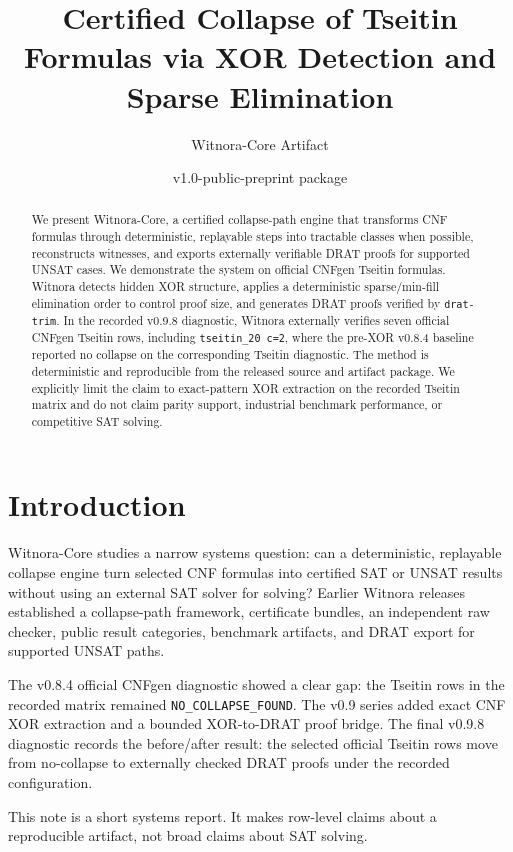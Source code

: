 \documentclass[10pt]{article}
\title{Certified Collapse of Tseitin Formulas via XOR Detection and Sparse Elimination}
\author{Witnora-Core Artifact}
\date{v1.0-public-preprint package}
\begin{document}
\maketitle

\begin{abstract}
We present Witnora-Core, a certified collapse-path engine that transforms CNF
formulas through deterministic, replayable steps into tractable classes when
possible, reconstructs witnesses, and exports externally verifiable DRAT proofs
for supported UNSAT cases. We demonstrate the system on official CNFgen Tseitin
formulas. Witnora detects hidden XOR structure, applies a deterministic
sparse/min-fill elimination order to control proof size, and generates DRAT
proofs verified by \texttt{drat-trim}. In the recorded v0.9.8 diagnostic,
Witnora externally verifies seven official CNFgen Tseitin rows, including
\texttt{tseitin\_20 c=2}, where the pre-XOR v0.8.4 baseline reported no
collapse on the corresponding Tseitin diagnostic. The method is deterministic
and reproducible from the released source and artifact package. We explicitly
limit the claim to exact-pattern XOR extraction on the recorded Tseitin matrix
and do not claim parity support, industrial benchmark performance, or
competitive SAT solving.
\end{abstract}

\section{Introduction}

Witnora-Core studies a narrow systems question: can a deterministic,
replayable collapse engine turn selected CNF formulas into certified SAT or
UNSAT results without using an external SAT solver for solving? Earlier
Witnora releases established a collapse-path framework, certificate bundles,
an independent raw checker, public result categories, benchmark artifacts, and
DRAT export for supported UNSAT paths.

The v0.8.4 official CNFgen diagnostic showed a clear gap: the Tseitin rows in
the recorded matrix remained \texttt{NO\_COLLAPSE\_FOUND}. The v0.9 series
added exact CNF XOR extraction and a bounded XOR-to-DRAT proof bridge. The
final v0.9.8 diagnostic records the before/after result: the selected official
Tseitin rows move from no-collapse to externally checked DRAT proofs under the
recorded configuration.

This note is a short systems report. It makes row-level claims about a
reproducible artifact, not broad claims about SAT solving.
\end{document}
